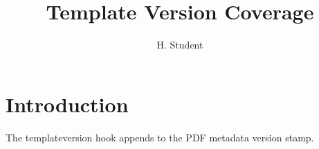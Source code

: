 \documentclass[phd,12pt,a4paper]{bangor}
\title{Template Version Coverage}
\author{H. Student}
\begin{document}
\makeatletter
{}
\makeatother
\maketitle
\chapter{Introduction}
The templateversion hook appends to the PDF metadata version stamp.
\end{document}
